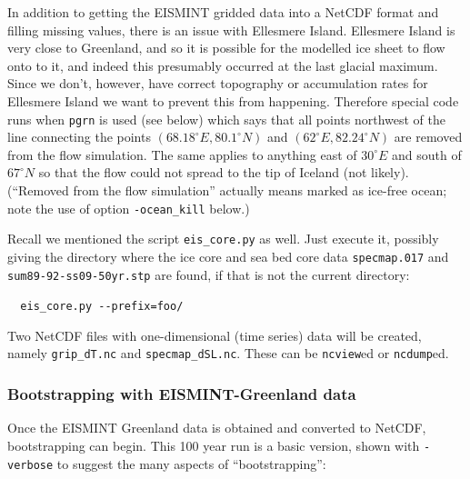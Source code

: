\documentclass[11pt,final]{amsart}
\begin{document}
In addition to getting the EISMINT gridded data into a NetCDF format and filling missing values, there is an issue with Ellesmere Island.  Ellesmere Island is very close to Greenland, and so it is possible for the modelled ice sheet to flow onto to it, and indeed this presumably occurred at the last glacial maximum.  Since we don't, however, have correct topography or accumulation rates for Ellesmere Island we want to prevent this from happening.  Therefore special code runs when \verb|pgrn| is used (see below) which says that all points northwest of the line connecting the points $(68.18^\circ E, 80.1^\circ N)$ and $(62^\circ E, 82.24^\circ N)$ are removed from the flow simulation.  The same applies to anything east of $30^\circ E$ and south of $67^\circ N$ so that the flow could not spread to the tip of Iceland (not likely).  (``Removed from the flow simulation'' actually means marked as ice-free ocean; note the use of option \verb|-ocean_kill| below.)

Recall we mentioned the script \verb|eis_core.py| as well.  Just execute it, possibly giving the directory where the ice core and sea bed core data \verb|specmap.017| and \verb|sum89-92-ss09-50yr.stp| are found, if that is not the current directory:

\verb|  eis_core.py --prefix=foo/|

Two NetCDF files with one-dimensional (time series) data will be created, namely \verb|grip_dT.nc| and \verb|specmap_dSL.nc|.  These can be \verb|ncview|ed or \verb|ncdump|ed.

\subsubsection{Bootstrapping with EISMINT-Greenland data}  Once the EISMINT Greenland data is obtained and converted to NetCDF, bootstrapping can begin.  This 100 year run is a basic version, shown with \verb|-verbose| to suggest the many aspects of ``bootstrapping'':
\end{document}
